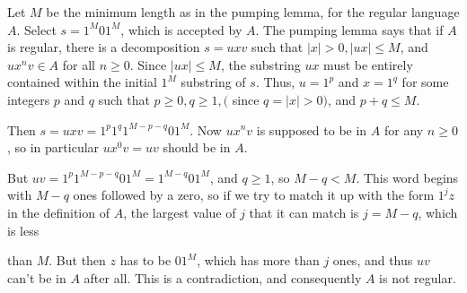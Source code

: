 \documentclass[a4paper]{exam}
\begin{document}
\begin{solution}

    Let $M$ be the minimum length as in the pumping lemma, for the regular language $A$. Select $s=1^{M} 01^{M}$, which is accepted by $A$. The pumping lemma says that if $A$ is regular, there is a decomposition $s=u x v$ such that $|x|>0,|u x| \leq M$, and $u x^{n} v \in A$ for all $n \geq 0$. Since $|u x| \leq M$, the substring $u x$ must be entirely contained within the initial $1^{M}$ substring of $s$. Thus, $u=1^{p}$ and $x=1^{q}$ for some integers $p$ and $q$ such that $p \geq 0, q \geq 1,($ since $q=|x|>0)$, and $p+q \leq M$.



    Then $s=u x v=1^{p} 1^{q} 1^{M-p-q} 01^{M} .$ Now $u x^{n} v$ is supposed to be in $A$ for any $n \geq 0$, so in particular $u x^{0} v=u v$ should be in $A$.



    But $u v=1^{p} 1^{M-p-q} 01^{M}=1^{M-q} 01^{M}$, and $q \geq 1$, so $M-q<M$. This word begins with $M-q$ ones followed by a zero, so if we try to match it up with the form $1^{j} z$ in the definition of $A$, the largest value of $j$ that it can match is $j=M-q$, which is less

    than $M$. But then $z$ has to be $01^{M}$, which has more than $j$ ones, and thus $u v$ can't be in $A$ after all. This is a contradiction, and consequently $A$ is not regular.

\end{solution}
\end{document}
